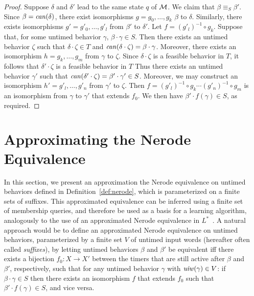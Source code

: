\begin{proof}
Suppose $\delta$ and $\delta'$ lead to the same state $q$ of ${\mathcal M}$.
We claim that $\beta \equiv_S \beta'$.
Since $\beta = \mathit{can}({\delta})$, there exist isomorphisms
$g = g_0 ,\ldots, g_k$  $\beta$ to $\delta$.
Similarly, there exists isomorphisms $g' = g'_0 ,\ldots, g'_l$ from
$\beta'$ to $\delta'$.
Let $f = (g'_l)^{-1} \circ g_k$.
Suppose that, for some untimed behavior $\gamma$, $\beta \cdot \gamma \in S$.
Then there exists an untimed behavior $\zeta$ such that $\delta \cdot \zeta \in T$ and $\mathit{can}({\delta \cdot \zeta}) = \beta \cdot \gamma$.
Moreover, there exists an isomorphism $h = g_k ,\ldots, g_m$ from $\gamma$ to $\zeta$.
Since $\delta \cdot \zeta$ is a feasible behavior in $T$, it follows that
$\delta' \cdot \zeta$ is a feasible behavior in $T$
Thus there exists an untimed behavior $\gamma'$ such that $\mathit{can}({\delta' \cdot \zeta}) = \beta' \cdot \gamma' \in S$.
Moreover, we may construct an isomorphism $h' = g'_l ,\ldots, g'_n$ from $\gamma'$ to $\zeta$.
Then $f = (g'_l)^{-1} \circ g_k \cdots (g'_n)^{-1} \circ g_m$ is an isomorphism from $\gamma$ to $\gamma'$ that extends $f_0$.
We then have $\beta' \cdot f(\gamma) \in S$, as required.
\end{proof}

\section{Approximating the Nerode Equivalence}
\label{sec:approx}

In this section, we present an approximation the Nerode equivalence on
untimed behaviors
defined in Definition~\ref{def:nerode}, which is parameterized on a
finite sets of suffixes. This
approximated equivalence can be inferred using a finite set of membership
queries, and therefore be used as a basis for a learning algorithm,
analogously to the use of an approximated Nerode equivalence in
$L^*$~\cite{Ang87}.
A natural approach
would be to define an approximated Nerode equivalence on untimed behaviors,
parameterized by a finite set $V$ of untimed input words (hereafter often
called {\em suffixes}), by letting
untimed behaviors $\beta$ and $\beta'$ be equivalent
iff there exists a bijection 
$f_0 : X \to X'$ between the timers that are still active after
$\beta$ and $\beta'$, respectively,
such that for any untimed behavior $\gamma$ with $\mathit{uiw}(\gamma)
\in V$:
if $\beta \cdot \gamma \in S$ then there exists an isomorphism $f$ that extends $f_0$ such that $\beta' \cdot f(\gamma) \in S$, and vice versa.

